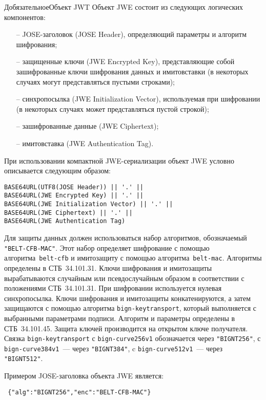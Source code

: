\begin{appendix}{Д}{обязательное}{Объект JWT}
Объект JWE состоит из следующих логических компонентов:
\begin{itemize}
\item[--] 
JOSE-заголовок (JOSE Header), определяющий параметры и алгоритм шифрования;
\item[--] 
защищенные ключи (JWE Encrypted Key), представляющие собой 
зашифрованные ключи шифрования данных и имитовставки 
(в некоторых случаях могут представляться пустыми строками);
\item[--] 
синхропосылка (JWE Initialization Vector), используемая при шифровании 
(в некоторых случаях может представляться пустой строкой);
\item[--]
зашифрованные данные (JWE Ciphertext);
\item[--]
имитовставка (JWE Authentication Tag).
\end{itemize}

При использовании компактной JWE-сериализации объект JWE условно 
описывается следующим образом:
\begin{lstlisting}
BASE64URL(UTF8(JOSE Header)) || '.' ||
BASE64URL(JWE Encrypted Key) || '.' ||
BASE64URL(JWE Initialization Vector) || '.' ||
BASE64URL(JWE Ciphertext) || '.' ||
BASE64URL(JWE Authentication Tag)
\end{lstlisting}

Для защиты данных должен использоваться набор алгоритмов,
обозначаемый \lstinline{"BELT-CFB-MAC"}. Этот набор определяет шифрование
с помощью алгоритма~\lstinline{belt-cfb} и имитозащиту с помощью 
алгоритма~\lstinline{belt-mac}. Алгоритмы определены в СТБ~34.101.31. 
Ключи шифрования и имитозащиты вырабатываются случайным или 
псевдослучайным образом в соответствии с положениями СТБ~34.101.31.
При шифровании используется нулевая синхропосылка.
%
Ключи шифрования и имитозащиты конкатенируются, а затем защищаются 
с помощью алгоритма \lstinline{bign-keytransport},
который выполняется с выбранными параметрами подписи.  
Алгоритм и параметры определены в СТБ~34.101.45.
%
Защита ключей производится на открытом ключе получателя. 
%
Связка \lstinline{bign-keytransport} с \lstinline{bign-curve256v1}
обозначается через \lstinline{"BIGNT256"},
с \lstinline{bign-curve384v1}~--- через \lstinline{"BIGNT384"},
c \lstinline{bign-curve512v1}~--- через \lstinline{"BIGNT512"}.

Примером JOSE-заголовка объекта JWE является:
\begin{lstlisting}
 {"alg":"BIGNT256","enc":"BELT-CFB-MAC"}
\end{lstlisting}


\end{appendix}
